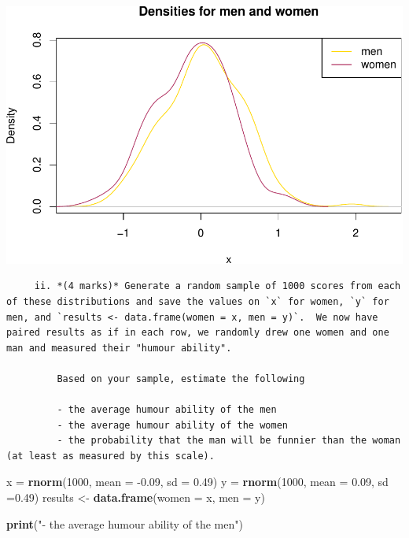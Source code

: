 \documentclass[
  9pt,
]{article}
\newenvironment{Shaded}{\begin{snugshade}}{\end{snugshade}}
\newcommand{\DataTypeTok}[1]{\textcolor[rgb]{0.13,0.29,0.53}{#1}}
\newcommand{\DecValTok}[1]{\textcolor[rgb]{0.00,0.00,0.81}{#1}}
\newcommand{\FloatTok}[1]{\textcolor[rgb]{0.00,0.00,0.81}{#1}}
\newcommand{\KeywordTok}[1]{\textcolor[rgb]{0.13,0.29,0.53}{\textbf{#1}}}
\newcommand{\NormalTok}[1]{#1}
\newcommand{\StringTok}[1]{\textcolor[rgb]{0.31,0.60,0.02}{#1}}
\begin{document}
\includegraphics{truncatedDistribution_files/figure-latex/unnamed-chunk-1-1.pdf}

\begin{verbatim}
     ii. *(4 marks)* Generate a random sample of 1000 scores from each of these distributions and save the values on `x` for women, `y` for men, and `results <- data.frame(women = x, men = y)`.  We now have paired results as if in each row, we randomly drew one women and one man and measured their "humour ability".
     
         Based on your sample, estimate the following
         
         - the average humour ability of the men
         - the average humour ability of the women
         - the probability that the man will be funnier than the woman (at least as measured by this scale).
\end{verbatim}

\begin{Shaded}
\begin{Highlighting}[]
\NormalTok{x =}\StringTok{ }\KeywordTok{rnorm}\NormalTok{(}\DecValTok{1000}\NormalTok{, }\DataTypeTok{mean =} \FloatTok{{-}0.09}\NormalTok{, }\DataTypeTok{sd =} \FloatTok{0.49}\NormalTok{)}
\NormalTok{y =}\StringTok{ }\KeywordTok{rnorm}\NormalTok{(}\DecValTok{1000}\NormalTok{, }\DataTypeTok{mean =} \FloatTok{0.09}\NormalTok{, }\DataTypeTok{sd =}\FloatTok{0.49}\NormalTok{)}
\NormalTok{results <{-}}\StringTok{ }\KeywordTok{data.frame}\NormalTok{(}\DataTypeTok{women =}\NormalTok{ x, }\DataTypeTok{men =}\NormalTok{ y)}

\KeywordTok{print}\NormalTok{(}\StringTok{"{-} the average humour ability of the men"}\NormalTok{)}
\end{Highlighting}
\end{Shaded}
\end{document}
